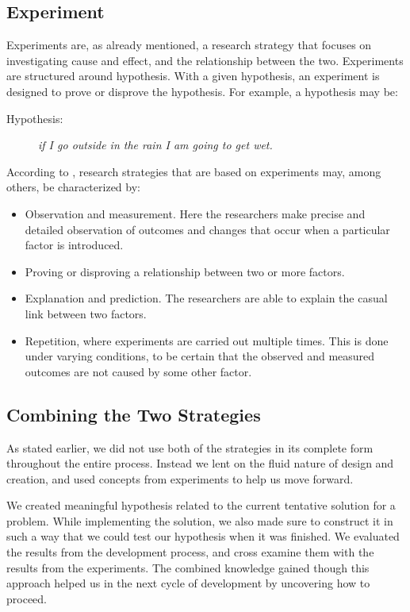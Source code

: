 \subsection{Experiment}
\label{sec:experiment}
Experiments are, as already mentioned, a research strategy that focuses on investigating cause and effect, and the relationship between the two. Experiments are structured around hypothesis. With a given hypothesis, an experiment is designed to prove or disprove the hypothesis. For example, a hypothesis may be:

\begin{description}
    \item[Hypothesis:]{\textit{if I go outside in the rain I am going to get wet.}}
\end{description}

According to \cite{oates2005researching}, research strategies that are based on experiments may, among others, be characterized by:

\begin{itemize}
    \item Observation and measurement. Here the researchers make precise and detailed observation of outcomes and changes that occur when a particular factor is introduced.
    \item Proving or disproving a relationship between two or more factors.
    \item Explanation and prediction. The researchers are able to explain the casual link between two factors.
    \item Repetition, where experiments are carried out multiple times. This is done under varying conditions, to be certain that the observed and measured outcomes are not caused by some other factor.
\end{itemize}

\subsection{Combining the Two Strategies}
\label{sec:combining_the_two_strategies}
As stated earlier, we did not use both of the strategies in its complete form throughout the entire process. Instead we lent on the fluid nature of design and creation, and used concepts from experiments to help us move forward. 

We created meaningful hypothesis related to the current tentative solution for a problem. While implementing the solution, we also made sure to construct it in such a way that we could test our hypothesis when it was finished. We evaluated the results from the development process, and cross examine them with the results from the experiments. The combined knowledge gained though this approach helped us in the next cycle of development by uncovering how to proceed.

